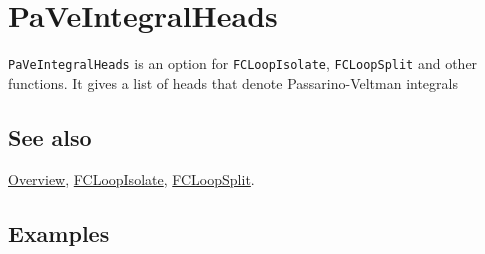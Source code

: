 \documentclass[../FeynCalcManual.tex]{subfiles}
\begin{document}
\hypertarget{paveintegralheads}{
\section{PaVeIntegralHeads}\label{paveintegralheads}}

\texttt{PaVeIntegralHeads} is an option for \texttt{FCLoopIsolate},
\texttt{FCLoopSplit} and other functions. It gives a list of heads that
denote Passarino-Veltman integrals

\subsection{See also}

\hyperlink{toc}{Overview}, \hyperlink{fcloopisolate}{FCLoopIsolate},
\hyperlink{fcloopsplit}{FCLoopSplit}.

\subsection{Examples}
\end{document}
